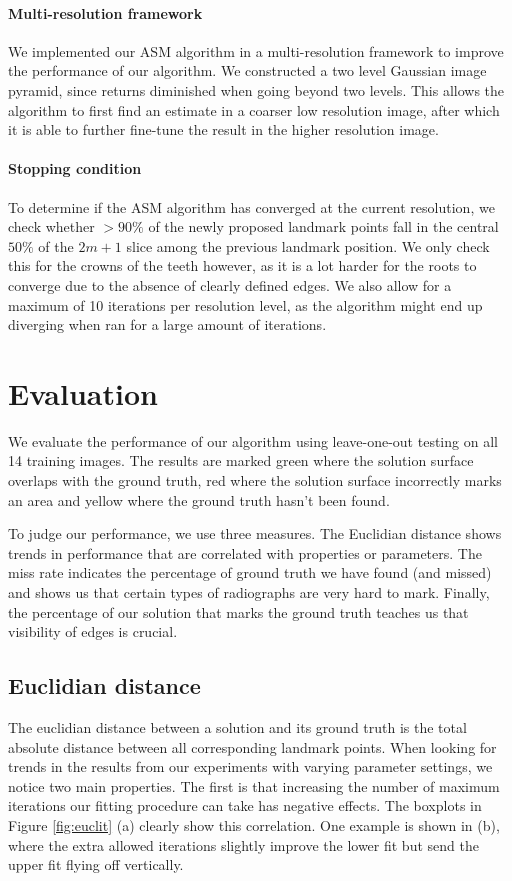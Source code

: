 \documentclass[a4paper,titlepage,12pt]{article}
\begin{document}
\paragraph{Multi-resolution framework}
We implemented our ASM algorithm in a multi-resolution framework to improve the performance of our algorithm.
We constructed a two level Gaussian image pyramid, since returns diminished when going beyond two levels.
This allows the algorithm to first find an estimate in a coarser low resolution image, after which it is able to further fine-tune the result in the higher resolution image.

\paragraph{Stopping condition}

To determine if the ASM algorithm has converged at the current resolution, we check whether $>90\%$ of the newly proposed landmark points fall in the central $50\%$ of the $2m + 1$ slice among the previous landmark position.
We only check this for the crowns of the teeth however, as it is a lot harder for the roots to converge due to the absence of clearly defined edges.
We also allow for a maximum of 10 iterations per resolution level, as the algorithm might end up diverging when ran for a large amount of iterations.

\section{Evaluation}
\label{sec:eval}
We evaluate the performance of our algorithm using leave-one-out testing on all 14 training images. The results are marked {\color{green} green} where the solution surface overlaps with the ground truth, {\color{red} red} where the solution surface incorrectly marks an area and {\color{yellow} yellow} where the ground truth hasn't been found. 

To judge our performance, we use three measures. The Euclidian distance shows trends in performance that are correlated with properties or parameters. The miss rate indicates the percentage of ground truth we have found (and missed) and shows us that certain types of radiographs are very hard to mark. Finally, the percentage of our solution that marks the ground truth teaches us that visibility of edges is crucial. 

\subsection{Euclidian distance}
The euclidian distance between a solution and its ground truth is the total absolute distance between all corresponding landmark points. When looking for trends in the results from our experiments with varying parameter settings, we notice two main properties. The first is that increasing the number of maximum iterations our fitting procedure can take has negative effects. The boxplots in Figure \ref{fig:euclit} (a) clearly show this correlation. One example is shown in (b), where the extra allowed iterations slightly improve the lower fit but send the upper fit flying off vertically. 
\end{document}
